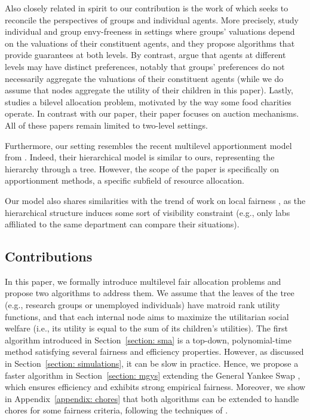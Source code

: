 \documentclass[]{article}
\begin{document}
Also closely related in spirit to our contribution is the work of \cite{scarlett_et_al2023,Bu_et_al2024,Aggarwal_et_al2024} which seeks to reconcile the perspectives of groups and individual agents. 
More precisely, \cite{scarlett_et_al2023} study individual and group envy-freeness in settings where groups' valuations depend on the valuations of their constituent agents, and they propose algorithms that provide guarantees at both levels. By contrast,
\cite{Bu_et_al2024}  argue that agents at different levels may have distinct preferences, notably that groups' preferences do not necessarily aggregate the valuations of their constituent agents (while we do assume that nodes aggregate the utility of their children in this paper). Lastly, \cite{Aggarwal_et_al2024} studies a bilevel allocation problem, motivated by the way some food charities operate. In contrast with our paper, their paper focuses on auction mechanisms. All of these papers remain limited to two-level settings. 

Furthermore, our setting resembles the recent multilevel apportionment model from \cite{Schmidt_et_al2025}. Indeed, their hierarchical model is similar to ours, representing the hierarchy through a tree. However, the scope of the paper is specifically on apportionment methods, a specific subfield of resource allocation.

Our model also shares similarities with the trend of work on local fairness \cite{Abebe_et_al_2017,Beynier_et_al2019, BREDERECK_2022}, as the hierarchical structure induces some sort of visibility constraint (e.g., only labs affiliated to the same department can compare their situations). 
 
\subsection{Contributions}
In this paper, we formally introduce multilevel fair allocation problems and propose two algorithms to address them. We assume that the leaves of the tree (e.g., research groups or unemployed individuals) have matroid rank utility functions, and that each internal node aims to maximize the utilitarian social welfare (i.e., its utility is equal to the sum of its children’s utilities). The first algorithm introduced in Section~\ref{section: sma} is a top-down, polynomial-time method satisfying several fairness and efficiency properties. However, as discussed in Section~\ref{section: simulations}, it can be slow in practice. Hence, we propose a faster algorithm in Section~\ref{section: mgys} extending the General Yankee Swap \cite{Viswanathan_Zick2023b}, which ensures efficiency and exhibits strong empirical fairness. Moreover, we show in Appendix~\ref{appendix: chores} that both algorithms can be extended to handle chores for some fairness criteria, following the techniques of \cite{Viswanathan_Zick2023b}.
\end{document}
